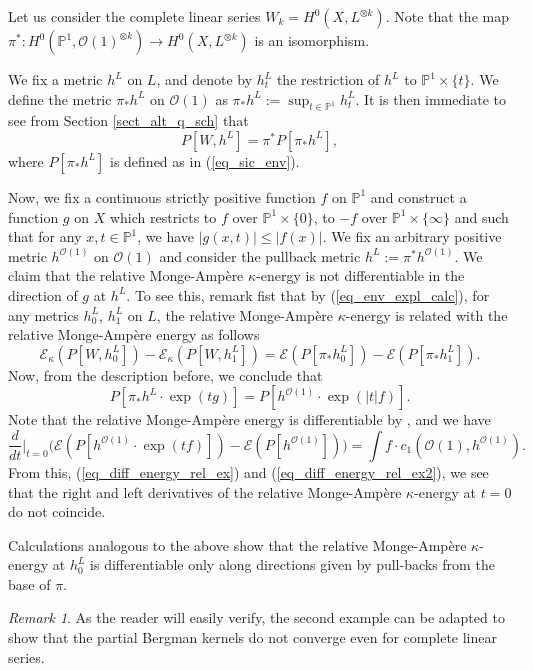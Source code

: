 \documentclass[12pt]{article}
\numberwithin{equation}{section}
\theoremstyle{theorem}
\theoremstyle{definition}
\theoremstyle{remark}
\newtheorem{rem}[thm]{Remark}
\begin{document}
	Let us consider the complete linear series $W_k = H^0(X, L^{\otimes k})$.
	Note that the map $\pi^* : H^0(\mathbb{P}^1, \mathscr{O}(1)^{\otimes k}) \to H^0(X, L^{\otimes k})$ is an isomorphism.
	\par 
	We fix a metric $h^L$ on $L$, and denote by $h^L_t$ the restriction of $h^L$ to $\mathbb{P}^1 \times \{ t \}$.
	We define the metric $\pi_* h^L$ on $\mathscr{O}(1)$ as $\pi_* h^L := \sup_{t \in \mathbb{P}^1} h^L_t$.
	It is then immediate to see from Section \ref{sect_alt_q_sch} that 
	\begin{equation}\label{eq_env_expl_calc}
		P[W, h^L] = \pi^* P[ \pi_* h^L],
	\end{equation}
	where $P[ \pi_* h^L]$ is defined as in (\ref{eq_sic_env}).
	\par 
	Now, we fix a continuous strictly positive function $f$ on $\mathbb{P}^1$ and construct a function $g$ on $X$ which restricts to $f$ over $\mathbb{P}^1 \times \{0\}$, to $-f$ over $\mathbb{P}^1 \times \{\infty\}$ and such that for any $x, t \in \mathbb{P}^1$, we have $|g(x, t)| \leq |f(x)|$. 
	We fix an arbitrary positive metric $h^{\mathscr{O}(1)}$ on $\mathscr{O}(1)$ and consider the pullback metric $h^L := \pi^* h^{\mathscr{O}(1)}$.
	We claim that the relative Monge-Ampère $\kappa$-energy is not differentiable in the direction of $g$ at $h^L$.
	To see this, remark fist that by (\ref{eq_env_expl_calc}), for any metrics $h^L_0$, $h^L_1$ on $L$, the relative Monge-Ampère $\kappa$-energy is related with the relative Monge-Ampère energy as follows 
	\begin{equation}\label{eq_diff_energy_rel_ex}
		\mathscr{E}_{\kappa}(P[W, h^L_0]) - \mathscr{E}_{\kappa}(P[W, h^L_1])
		=
		\mathscr{E}(P[\pi_* h^L_0]) - \mathscr{E}(P[\pi_* h^L_1]).
	\end{equation}
	Now, from the description before, we conclude that 
	\begin{equation}\label{eq_diff_energy_rel_ex2}
		P[\pi_* h^L \cdot \exp(t g)]
		=
		P[h^{\mathscr{O}(1)} \cdot \exp(|t| f)].
	\end{equation}
	Note that the relative Monge-Ampère energy is differentiable by \cite{BermanBouckBalls}, and we have
	\begin{equation}
		\frac{d}{dt}\Big|_{t = 0}
		\Big(
		\mathscr{E}(P[h^{\mathscr{O}(1)} \cdot \exp(t f)])
		-
		\mathscr{E}(P[h^{\mathscr{O}(1)}])
		\Big)
		=
		\int f \cdot c_1(\mathscr{O}(1), h^{\mathscr{O}(1)}).
	\end{equation}
	From this, (\ref{eq_diff_energy_rel_ex}) and (\ref{eq_diff_energy_rel_ex2}),  we see that the right and left derivatives of the relative Monge-Ampère $\kappa$-energy at $t = 0$ do not coincide.
	\par 
	Calculations analogous to the above show that the relative Monge-Amp\`ere $\kappa$-energy at $h^L_0$ is differentiable only along directions given by pull-backs from the base of $\pi$.
	\par 
	\begin{rem}
		As the reader will easily verify, the second example can be adapted to show that the partial Bergman kernels do not converge even for complete linear series.
	\end{rem} 
	
\end{document}
